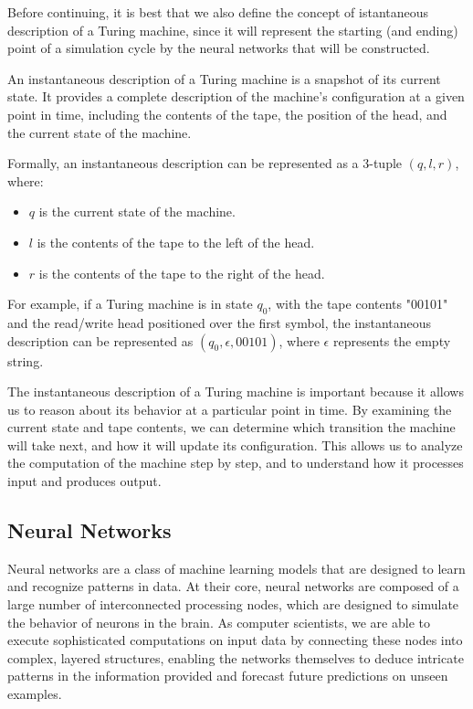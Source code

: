 \documentclass{article}
\begin{document}
Before continuing, it is best that we also define the concept of istantaneous description of a Turing machine, since it will represent the starting (and ending) point of a simulation cycle by the neural networks that will be constructed.

An instantaneous description of a Turing machine is a snapshot of its current state. It provides a complete description of the machine's configuration at a given point in time, including the contents of the tape, the position of the head, and the current state of the machine.

Formally, an instantaneous description can be represented as a 3-tuple $(q, l, r)$, where:

\begin{itemize}
    \item $q$ is the current state of the machine.
    \item $l$ is the contents of the tape to the left of the head.
    \item $r$ is the contents of the tape to the right of the head.
\end{itemize}

For example, if a Turing machine is in state $q_0$, with the tape contents "00101" and the read/write head positioned over the first symbol, the instantaneous description can be represented as $(q_0, \epsilon, 00101)$, where $\epsilon$ represents the empty string.

The instantaneous description of a Turing machine is important because it allows us to reason about its behavior at a particular point in time. By examining the current state and tape contents, we can determine which transition the machine will take next, and how it will update its configuration. This allows us to analyze the computation of the machine step by step, and to understand how it processes input and produces output.

\subsection{Neural Networks}

Neural networks are a class of machine learning models that are designed to learn and recognize patterns in data. At their core, neural networks are composed of a large number of interconnected processing nodes, which are designed to simulate the behavior of neurons in the brain. As computer scientists, we are able to execute sophisticated computations on input data by connecting these nodes into complex, layered structures, enabling the networks themselves to deduce intricate patterns in the information provided and forecast future predictions on unseen examples.
\end{document}
